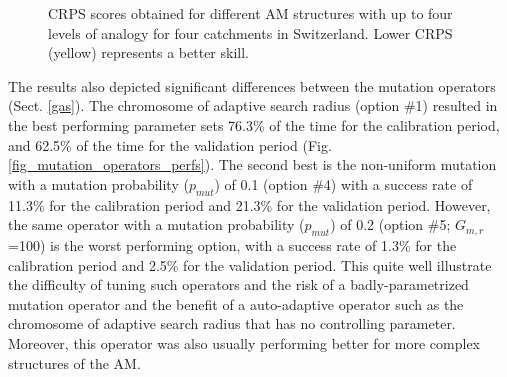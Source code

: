 \documentclass[draft]{agujournal2019}
\begin{document}
\begin{figure}[hbt]
	\noindent{}
	\caption{CRPS scores obtained for different AM structures with up to four levels of analogy for four catchments in Switzerland. Lower CRPS (yellow) represents a better skill.}
	\label{fig_structures}
\end{figure}

The results also depicted significant differences between the mutation operators (Sect. \ref{gas}). The chromosome of adaptive search radius (option \#1) resulted in the best performing parameter sets 76.3\% of the time for the calibration period, and 62.5\% of the time for the validation period (Fig. \ref{fig_mutation_operators_perfs}).  The second best is the non-uniform mutation with a mutation probability ($p_{mut}$) of 0.1 (option \#4) with a success rate of 11.3\% for the calibration period and 21.3\% for the validation period. However, the same operator with a  mutation probability ($p_{mut}$) of 0.2 (option \#5; $G_{m,r}$=100) is the worst performing option, with a success rate of 1.3\% for the calibration period and 2.5\% for the validation period. This quite well illustrate the difficulty of tuning such operators and the risk of a badly-parametrized mutation operator and the benefit of a auto-adaptive operator such as the chromosome of adaptive search radius that has no controlling parameter. Moreover, this operator was also usually performing better for more complex structures of the AM.
\end{document}
